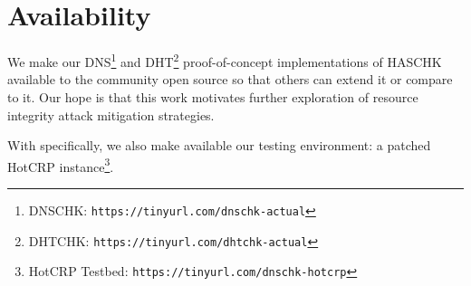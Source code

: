 \section{Availability} \label{sec:availability}

We make our DNS\footnote{DNSCHK: \texttt{https://tinyurl.com/dnschk-actual}} and
DHT\footnote{DHTCHK: \texttt{https://tinyurl.com/dhtchk-actual}}
proof-of-concept implementations of HASCHK available to the community open
source so that others can extend it or compare to it. Our hope is that this work
motivates further exploration of resource integrity attack mitigation
strategies.

With \DNSSYS{} specifically, we also make available our testing environment: a patched HotCRP instance\footnote{HotCRP Testbed: \texttt{https://tinyurl.com/dnschk-hotcrp}}.
